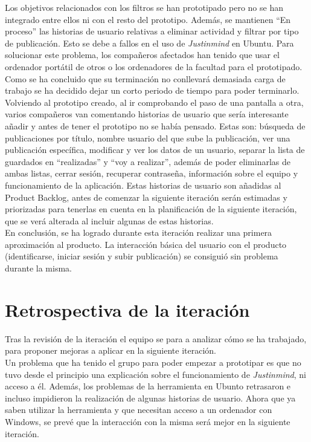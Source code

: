 \documentclass[11pt]{article}
\begin{document}
Los objetivos relacionados con los filtros se han prototipado pero no se han integrado entre ellos ni con el resto del prototipo. Además, se mantienen ``En proceso'' las historias de usuario relativas a eliminar actividad y filtrar por tipo de publicación. Esto se debe a fallos en el uso de \textit{Justinmind} en Ubuntu. Para solucionar este problema, los compañeros afectados han tenido que usar el ordenador portátil de otros o los ordenadores de la facultad para el prototipado. Como se ha concluido que su terminación no conllevará demasiada carga de trabajo se ha decidido dejar un corto periodo de tiempo para poder terminarlo. \\

Volviendo al prototipo creado, al ir comprobando el paso de una pantalla a otra, varios compañeros van comentando historias de usuario que sería interesante añadir y antes de tener el prototipo no se había pensado. Estas son: búsqueda de publicaciones por título, nombre usuario del que sube la publicación, ver una publicación específica, modificar y ver los datos de un usuario, separar la lista de guardados en ``realizadas'' y ``voy a realizar'', además de poder eliminarlas de ambas listas, cerrar sesión, recuperar contraseña, información sobre el equipo y funcionamiento de la aplicación. Estas historias de usuario son añadidas al Product Backlog, antes de comenzar la siguiente iteración serán estimadas y priorizadas para tenerlas en cuenta en la planificación de la siguiente iteración, que se verá alterada al incluir algunas de estas historias.\\

En conclusión, se ha logrado durante esta iteración realizar una primera aproximación al producto. La interacción básica del usuario con el producto (identificarse, iniciar sesión y subir publicación) se consiguió sin problema durante la misma.\\

\newpage
\section*{Retrospectiva de la iteración}
Tras la revisión de la iteración el equipo se para a analizar cómo se ha trabajado, para proponer mejoras a aplicar en la siguiente iteración.\\

Un problema que ha tenido el grupo para poder empezar a prototipar es que no tuvo desde el principio una explicación sobre el funcionamiento de \textit{Justinmind}, ni acceso a él. Además, los problemas de la herramienta en Ubunto retrasaron e incluso impidieron la realización de algunas historias de usuario. Ahora que ya saben utilizar la herramienta y que necesitan acceso a un ordenador con Windows, se prevé que la interacción con la misma será mejor en la siguiente iteración.\\
\end{document}
